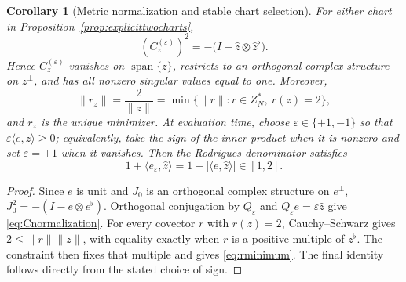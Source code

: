 \documentclass[11pt,a4paper]{article}
\newtheorem{corollary}[theorem]{Corollary}
\theoremstyle{definition}
\theoremstyle{remark}
\newcommand{\spanof}{\operatorname{span}}
\begin{document}
\begin{corollary}[Metric normalization and stable chart selection]
\label{cor:chartnormalization}
For either chart in Proposition~\ref{prop:explicittwocharts},
\begin{equation}\label{eq:Cnormalization}
 \boxed{
 (C_z^{(\varepsilon)})^2
 =-\bigl(I-\widehat z\otimes\widehat z^\flat\bigr).}
\end{equation}
Hence $C_z^{(\varepsilon)}$ vanishes on $\spanof\{z\}$, restricts to an orthogonal complex
structure on $z^\perp$, and has all nonzero singular values equal to one.  Moreover,
\begin{equation}\label{eq:rminimum}
 \boxed{
 \|r_z\|=\frac{2}{\|z\|}
 =\min\{\|r\|:r\in Z_N^*,\ r(z)=2\},}
\end{equation}
and $r_z$ is the unique minimizer.  At evaluation time, choose
$\varepsilon\in\{+1,-1\}$ so that
$\varepsilon\langle e,\widehat z\rangle\geq0$; equivalently, take the sign of the inner
product when it is nonzero and set $\varepsilon=+1$ when it vanishes.  Then the Rodrigues
denominator satisfies
\begin{equation}\label{eq:stablechartdenominator}
 1+\langle e_\varepsilon,\widehat z\rangle
 =1+|\langle e,\widehat z\rangle|\in[1,2].
\end{equation}
\end{corollary}

\begin{proof}
Since $e$ is unit and $J_0$ is an orthogonal complex structure on $e^\perp$,
$J_0^2=-(I-e\otimes e^\flat)$.  Orthogonal conjugation by $Q_\varepsilon$ and
$Q_\varepsilon e=\varepsilon\widehat z$ give \eqref{eq:Cnormalization}.  For every covector
$r$ with $r(z)=2$, Cauchy--Schwarz gives $2\leq\|r\|\|z\|$, with equality exactly when
$r$ is a positive multiple of $z^\flat$.  The constraint then fixes that multiple and gives
\eqref{eq:rminimum}.  The final identity follows directly from the stated choice of sign.
\end{proof}
\end{document}
